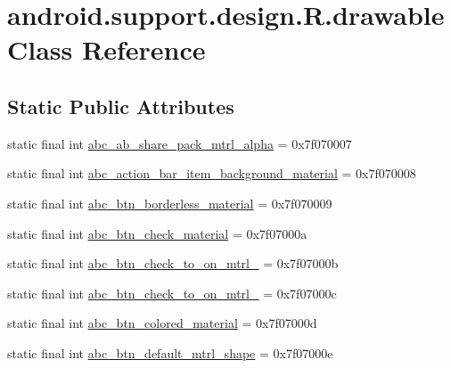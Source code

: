 \hypertarget{classandroid_1_1support_1_1design_1_1R_1_1drawable}{}\section{android.\+support.\+design.\+R.\+drawable Class Reference}
\label{classandroid_1_1support_1_1design_1_1R_1_1drawable}
\subsection*{Static Public Attributes}
\begin{DoxyCompactItemize}
\item 
static final int \mbox{\hyperlink{classandroid_1_1support_1_1design_1_1R_1_1drawable_a625cabc6eb240aa7880b51672cf7a8fe}{abc\+\_\+ab\+\_\+share\+\_\+pack\+\_\+mtrl\+\_\+alpha}} = 0x7f070007
\item 
static final int \mbox{\hyperlink{classandroid_1_1support_1_1design_1_1R_1_1drawable_a68a1b154dd7f464140cfa7da69c3f930}{abc\+\_\+action\+\_\+bar\+\_\+item\+\_\+background\+\_\+material}} = 0x7f070008
\item 
static final int \mbox{\hyperlink{classandroid_1_1support_1_1design_1_1R_1_1drawable_a9aec4c6386a209299b4feedfeb3cfc32}{abc\+\_\+btn\+\_\+borderless\+\_\+material}} = 0x7f070009
\item 
static final int \mbox{\hyperlink{classandroid_1_1support_1_1design_1_1R_1_1drawable_a765ed07aab918db5eb82ac420614fb81}{abc\+\_\+btn\+\_\+check\+\_\+material}} = 0x7f07000a
\item 
static final int \mbox{\hyperlink{classandroid_1_1support_1_1design_1_1R_1_1drawable_a14f5a95b1142d505e2ab42008b9be478}{abc\+\_\+btn\+\_\+check\+\_\+to\+\_\+on\+\_\+mtrl\+\_}} = 0x7f07000b
\item 
static final int \mbox{\hyperlink{classandroid_1_1support_1_1design_1_1R_1_1drawable_a875816c18771a913557708c7f31df30d}{abc\+\_\+btn\+\_\+check\+\_\+to\+\_\+on\+\_\+mtrl\+\_}} = 0x7f07000c
\item 
static final int \mbox{\hyperlink{classandroid_1_1support_1_1design_1_1R_1_1drawable_ac6ab80376e6c2c49f68b33f9b4fa217f}{abc\+\_\+btn\+\_\+colored\+\_\+material}} = 0x7f07000d
\item 
static final int \mbox{\hyperlink{classandroid_1_1support_1_1design_1_1R_1_1drawable_a221d8c015be6efecdbce8deef1aff0d3}{abc\+\_\+btn\+\_\+default\+\_\+mtrl\+\_\+shape}} = 0x7f07000e
\item 

\end{DoxyCompactItemize}
